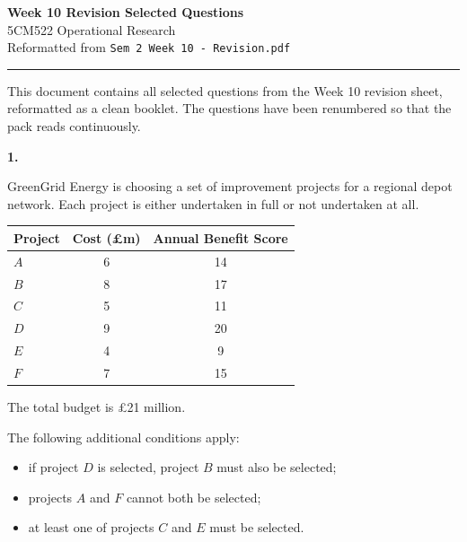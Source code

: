 \documentclass[11pt,a4paper]{article}
\begin{document}
\begin{center}
{\Large\bfseries\color{packblue} Week 10 Revision Selected Questions}\\[0.4em]
{\large 5CM522 Operational Research}\\[0.3em]
{\color{packgrey} Reformatted from \texttt{Sem 2 Week 10 - Revision.pdf}}
\end{center}

\vspace{0.8em}
\hrule
\vspace{0.8em}

This document contains all selected questions from the Week 10 revision sheet, reformatted as a clean booklet.
The questions have been renumbered so that the pack reads continuously.

\newpage

\textbf{1.}

GreenGrid Energy is choosing a set of improvement projects for a regional depot network.
Each project is either undertaken in full or not undertaken at all.

\begin{center}
\begin{tabular}{lcc}
\toprule
Project & Cost (\pounds m) & Annual Benefit Score \\
\midrule
$A$ & 6 & 14 \\
$B$ & 8 & 17 \\
$C$ & 5 & 11 \\
$D$ & 9 & 20 \\
$E$ & 4 & 9 \\
$F$ & 7 & 15 \\
\bottomrule
\end{tabular}
\end{center}

The total budget is \pounds21 million.

The following additional conditions apply:
\begin{itemize}[leftmargin=0.95cm, itemsep=0.25em]
\item if project $D$ is selected, project $B$ must also be selected;
\item projects $A$ and $F$ cannot both be selected;
\item at least one of projects $C$ and $E$ must be selected.
\end{itemize}
\end{document}

